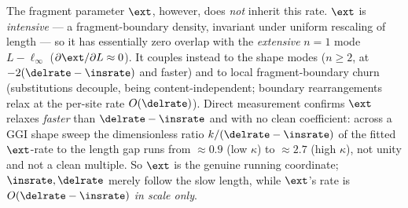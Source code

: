 The fragment parameter $\ext$, however, does \emph{not} inherit this rate.  $\ext$
is \emph{intensive} --- a fragment-boundary density, invariant under uniform
rescaling of length --- so it has essentially zero overlap with the
\emph{extensive} $n{=}1$ mode $L-\ell_\infty$ ($\partial\ext/\partial L\approx0$).
It couples instead to the shape modes ($n\ge2$, at $-2(\delrate-\insrate)$ and
faster) and to local fragment-boundary churn (substitutions decouple, being
content-independent; boundary rearrangements relax at the per-site rate
$O(\delrate)$).  Direct measurement confirms $\ext$ relaxes \emph{faster} than
$\delrate-\insrate$ and with no clean coefficient: across a GGI shape sweep the
dimensionless ratio $k/(\delrate-\insrate)$ of the fitted $\ext$-rate to the
length gap runs from $\approx0.9$ (low $\kappa$) to $\approx2.7$ (high $\kappa$),
not unity and not a clean multiple.  So $\ext$ is the genuine running coordinate;
$\insrate,\delrate$ merely follow the slow length, while $\ext$'s rate is
$O(\delrate-\insrate)$ \emph{in scale only}.

